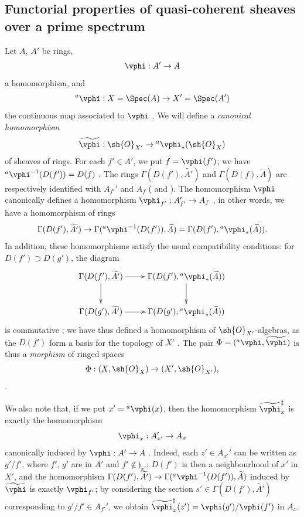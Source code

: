 \subsection{Functorial properties of quasi-coherent sheaves over a prime spectrum}
\label{subsection:I.1.6}

\begin{env}[1.6.1]
\label{I.1.6.1}
Let $A$, $A'$ be rings,
\[
  \vphi:A'\to A
\]
a homomorphism, and
\[
  {}^a\vphi:X=\Spec(A)\to X'=\Spec(A')
\]
the continuous map associated to $\vphi$ .
We will define a \emph{canonical homomorphism}
\[
  \widetilde{\vphi}:\sh{O}_{X'}\to{}^a\vphi_*(\sh{O}_X)
\]
of sheaves of rings.
For each $f'\in A'$, we put $f=\vphi(f')$;
we have ${}^a\vphi^{-1}(D(f'))=D(f)$ .
The rings $\Gamma(D(f'),\widetilde{A'})$ and $\Gamma(D(f),\widetilde{A})$ are respectively identified with $A_{f'}'$ and $A_f$ ( and ). The homomorphism $\vphi$ canonically defines a homomorphism $\vphi_{f'}:A_{f'}'\to A_f$ , in other words, we have a homomorphism of rings
\[
  \Gamma(D(f'),\widetilde{A'})\to\Gamma({}^a\vphi^{-1}(D(f')),\widetilde{A})
  =\Gamma(D(f'),{}^a\vphi_*(\widetilde{A})).
\]
In addition, these homomorphisms satisfy the usual compatibility conditions: for $D(f')\supset D(g')$, the diagram
\[
  \xymatrix{
    \Gamma(D(f'),\widetilde{A'})\ar[r]\ar[d] &
    \Gamma(D(f'),{}^a\vphi_*(\widetilde{A}))\ar[d]\\
    \Gamma(D(g'),\widetilde{A'})\ar[r] &
    \Gamma(D(g'),{}^a\vphi_*(\widetilde{A}))
  }
\]
is commutative ;
we have thus defined a homomorphism of $\sh{O}_{X'}$-algebras, as the $D(f')$ form a basis for the topology of $X'$ .
The pair $\Phi=({}^a\vphi,\widetilde{\vphi})$ is thus a \emph{morphism} of ringed spaces
\[
  \Phi:(X,\sh{O}_X)\to(X',\sh{O}_{X'}),
\]
.

We also note that, if we put $x'={}^a\vphi(x)$, then the homomorphism $\widetilde{\vphi}_x^\sharp$  is exactly the homomorphism
\[
  \vphi_x:A_{x'}'\to A_x
\]
canonically induced by $\vphi:A'\to A$ .
Indeed, each $z'\in A_{x'}'$ can be written as $g'/f'$, where $f'$, $g'$ are in $A'$ and $f'\not\in\mathfrak{j}_{x'}$;
$D(f')$ is then a neighbourhood of $x'$ in $X'$, and the homomorphism $\Gamma(D(f'),\widetilde{A'})\to\Gamma({}^a\vphi^{-1}(D(f')),\widetilde{A})$ induced by $\widetilde{\vphi}$ is exactly $\vphi_{f'}$;
by considering the section $s'\in\Gamma(D(f'),\widetilde{A'})$ corresponding to $g'/f'\in A_{f'}'$, we obtain $\widetilde{\vphi}_x^\sharp(z')=\vphi(g')/\vphi(f')$ in $A_x$.
\end{env}

